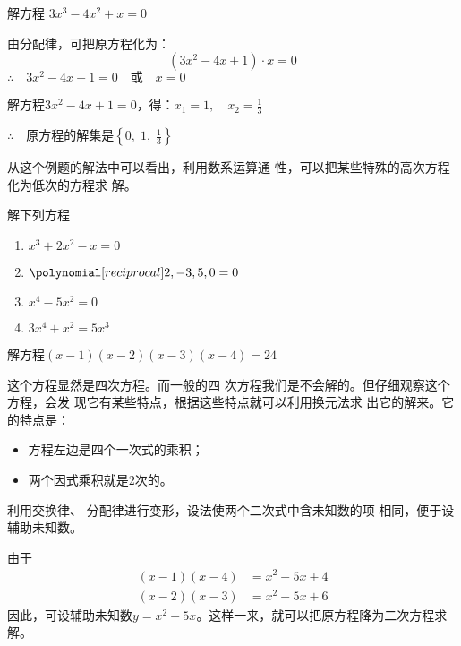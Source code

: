 \begin{example}
    解方程 $3x^3-4x^2+x=0$
\end{example}

\begin{solution}
由分配律，可把原方程化为：
\[(3x^2-4x+1)\cdot x=0\]
$\therefore\quad 3x^2-4x+1=0\quad \text{或}\quad x=0$

解方程$3x^2-4x+1=0$，得：$x_1=1,\quad x_2=\frac{1}{3}$

$\therefore\quad $原方程的解集是$\left\{0,\; 1,\; \frac{1}{3}\right\}$
\end{solution}

从这个例题的解法中可以看出，利用数系运算通
性，可以把某些特殊的高次方程化为低次的方程求
解。






\begin{ex}
解下列方程
\begin{multicols}{2}   
\begin{enumerate}
    \item $x^3+2x^2-x=0$
    \item $\poly{2,-3,5,0}=0$
    \item $x^4-5x^2=0$
    \item $3x^4+x^2=5x^3$
\end{enumerate}
\end{multicols} 
\end{ex}



\begin{example}
解方程$(x-1)(x-2)(x-3)(x-4)=24$ 
\end{example}

\begin{analyze}
    这个方程显然是四次方程。而一般的四
次方程我们是不会解的。但仔细观察这个方程，会发
现它有某些特点，根据这些特点就可以利用换元法求
出它的解来。它的特点是：
\begin{itemize}
    \item 方程左边是四个一次式的乘积；
    \item 两个因式乘积就是2次的。
\end{itemize}
利用交换律、
分配律进行变形，设法使两个二次式中含未知数的项
相同，便于设辅助未知数。

由于
\[\begin{split}
    (x-1)(x-4)&=x^2-5x+4\\
    (x-2)(x-3)&=x^2-5x+6
\end{split}\]
因此，可设辅助未知数$y=x^2-5x$。这样一来，就可以把原方程降为二次方程求解。
\end{analyze}

